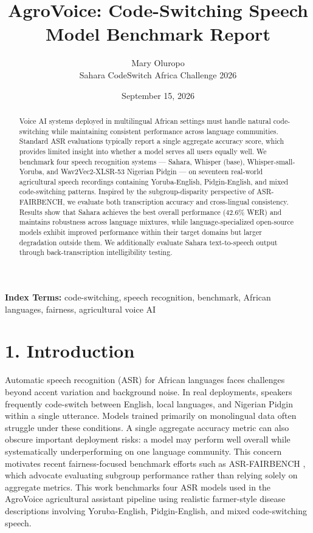 \documentclass[9pt,twocolumn]{article}
\title{\vspace{-2em}\large AgroVoice: Code-Switching Speech Model Benchmark Report}
\author{\small Mary Oluropo \\ \small Sahara CodeSwitch Africa Challenge 2026}
\date{\vspace{-1em}\small September 15, 2026}
\begin{document}
\maketitle
\vspace{-1.5em}

\begin{abstract}
\small
Voice AI systems deployed in multilingual African settings must handle natural code-switching while maintaining consistent performance across language communities. Standard ASR evaluations typically report a single aggregate accuracy score, which provides limited insight into whether a model serves all users equally well. We benchmark four speech recognition systems --- Sahara, Whisper (base), Whisper-small-Yoruba, and Wav2Vec2-XLSR-53 Nigerian Pidgin --- on seventeen real-world agricultural speech recordings containing Yoruba-English, Pidgin-English, and mixed code-switching patterns. Inspired by the subgroup-disparity perspective of ASR-FAIRBENCH, we evaluate both transcription accuracy and cross-lingual consistency. Results show that Sahara achieves the best overall performance (42.6\% WER) and maintains robustness across language mixtures, while language-specialized open-source models exhibit improved performance within their target domains but larger degradation outside them. We additionally evaluate Sahara text-to-speech output through back-transcription intelligibility testing.
\end{abstract}

\textbf{\small Index Terms:} code-switching, speech recognition, benchmark, African languages, fairness, agricultural voice AI

\section*{1. Introduction}
Automatic speech recognition (ASR) for African languages faces challenges beyond accent variation and background noise. In real deployments, speakers frequently code-switch between English, local languages, and Nigerian Pidgin within a single utterance. Models trained primarily on monolingual data often struggle under these conditions. A single aggregate accuracy metric can also obscure important deployment risks: a model may perform well overall while systematically underperforming on one language community. This concern motivates recent fairness-focused benchmark efforts such as ASR-FAIRBENCH \cite{fairbench}, which advocate evaluating subgroup performance rather than relying solely on aggregate metrics. This work benchmarks four ASR models used in the AgroVoice agricultural assistant pipeline using realistic farmer-style disease descriptions involving Yoruba-English, Pidgin-English, and mixed code-switching speech.
\end{document}
